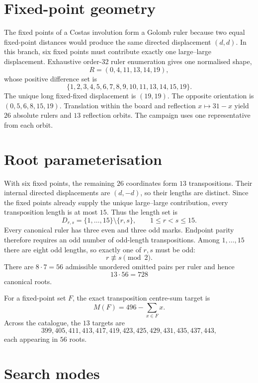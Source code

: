\documentclass[11pt,a4paper]{article}
\begin{document}
\section{Fixed-point geometry}
The fixed points of a Costas involution form a Golomb ruler because two equal fixed-point distances would produce the same directed displacement $(d,d)$. In this branch, six fixed points must contribute exactly one large--large displacement. Exhaustive order-$32$ ruler enumeration gives one normalised shape,
\[
R=(0,4,11,13,14,19),
\]
whose positive difference set is
\[
\{1,2,3,4,5,6,7,8,9,10,11,13,14,15,19\}.
\]
The unique long fixed-fixed displacement is $(19,19)$. The opposite orientation is $(0,5,6,8,15,19)$. Translation within the board and reflection $x\mapsto31-x$ yield $26$ absolute rulers and $13$ reflection orbits. The campaign uses one representative from each orbit.

\section{Root parameterisation}
With six fixed points, the remaining $26$ coordinates form $13$ transpositions. Their internal directed displacements are $(d,-d)$, so their lengths are distinct. Since the fixed points already supply the unique large--large contribution, every transposition length is at most $15$. Thus the length set is
\[
D_{r,s}=\{1,\ldots,15\}\setminus\{r,s\},\qquad 1\le r<s\le15.
\]
Every canonical ruler has three even and three odd marks. Endpoint parity therefore requires an odd number of odd-length transpositions. Among $1,\ldots,15$ there are eight odd lengths, so exactly one of $r,s$ must be odd:
\[
\boxed{r\not\equiv s\pmod2.}
\]
There are $8\cdot7=56$ admissible unordered omitted pairs per ruler and hence
\[
\boxed{13\cdot56=728}
\]
canonical roots.

For a fixed-point set $F$, the exact transposition centre-sum target is
\[
\boxed{M(F)=496-\sum_{x\in F}x.}
\]
Across the catalogue, the $13$ targets are
\[
399,405,411,413,417,419,423,425,429,431,435,437,443,
\]
each appearing in $56$ roots.

\section{Search modes}
\end{document}
